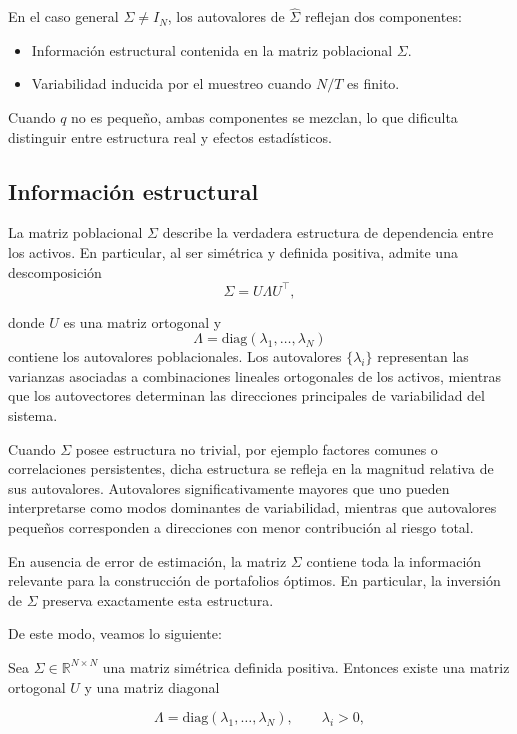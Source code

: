 \documentclass[letterpaper,12pt,oneside]{book}
\begin{document}
En el caso general $\Sigma \neq I_N$, los autovalores
de $\widehat{\Sigma}$ reflejan dos componentes:

\begin{itemize}
    \item Información estructural contenida en la matriz poblacional $\Sigma$.
    \item Variabilidad inducida por el muestreo cuando $N/T$ es finito.
\end{itemize}

Cuando $q$ no es pequeño, ambas componentes se mezclan, lo que dificulta distinguir entre estructura real y efectos estadísticos.

\subsection*{Información estructural}

La matriz poblacional $\Sigma$ describe la verdadera estructura de dependencia entre los activos. En particular,
al ser simétrica y definida positiva, admite una descomposición
\[
\Sigma = U \Lambda U^\top,
\]

donde $U$ es una matriz ortogonal y
\[
\Lambda = \mathrm{diag}(\lambda_1,\dots,\lambda_N)
\]
contiene los autovalores poblacionales. Los autovalores $\{\lambda_i\}$ representan las varianzas asociadas
a combinaciones lineales ortogonales de los activos, mientras que los autovectores determinan las direcciones principales
de variabilidad del sistema.

Cuando $\Sigma$ posee estructura no trivial, por ejemplo factores comunes o correlaciones persistentes, dicha estructura se refleja en la magnitud relativa de sus autovalores. Autovalores significativamente mayores que uno pueden interpretarse
como modos dominantes de variabilidad, mientras que autovalores pequeños corresponden a direcciones con menor contribución al riesgo total.

En ausencia de error de estimación, la matriz $\Sigma$ contiene toda la información relevante para la construcción de portafolios óptimos. En particular, la inversión de $\Sigma$ preserva exactamente esta estructura.

De este modo, veamos lo siguiente:

Sea $\Sigma \in \mathbb{R}^{N \times N}$ una matriz simétrica definida positiva. Entonces existe una matriz ortogonal $U$ y una matriz diagonal

\[
\Lambda = \mathrm{diag}(\lambda_1,\dots,\lambda_N),
\qquad \lambda_i > 0,
\]
\end{document}
